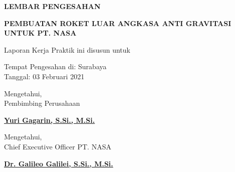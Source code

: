 \begin{center}
  {\Large \textbf{LEMBAR PENGESAHAN}}
  \vspace{6ex}


  {\large \textbf{PEMBUATAN ROKET LUAR ANGKASA ANTI GRAVITASI UNTUK PT. NASA}}
  \vspace{6ex}

  Laporan Kerja Praktik ini disusun untuk \lipsum[1][1]
  \vspace{2ex}

  Tempat Pengesahan di: Surabaya \\
  Tanggal: 03 Februari 2021
  \vspace{8ex}

  Mengetahui, \\
  Pembimbing Perusahaan
  \vspace{12ex}

  \textbf{\underline{Yuri Gagarin, S.Si., M.Si.}}
  \vspace{8ex}

  Mengetahui, \\
  Chief Executive Officer PT. NASA
  \vspace{12ex}

  \textbf{\underline{Dr. Galileo Galilei, S.Si., M.Si.}}

\end{center}